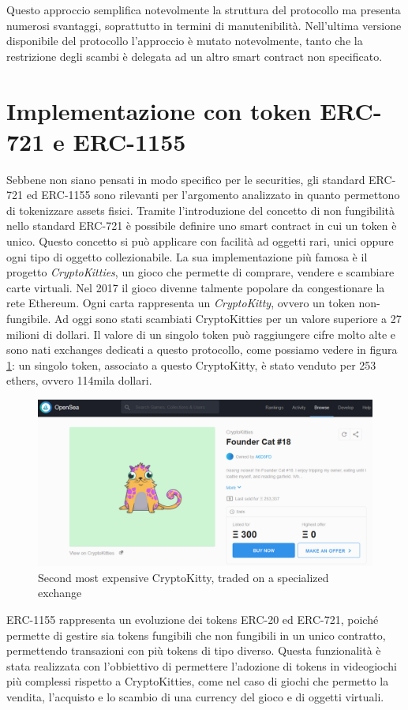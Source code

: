 Questo approccio semplifica notevolmente la struttura del protocollo ma presenta numerosi svantaggi, soprattutto in termini di manutenibilità. Nell'ultima versione disponibile del protocollo l'approccio è mutato notevolmente, tanto che la restrizione degli scambi è delegata ad un altro smart contract non specificato. 
\section{Implementazione con token ERC-721 e ERC-1155}
Sebbene non siano pensati in modo specifico per le securities, gli standard ERC-721 ed ERC-1155 sono rilevanti per l'argomento analizzato in quanto permettono di tokenizzare assets fisici. Tramite l'introduzione del concetto di non fungibilità nello standard ERC-721 è possibile definire uno smart contract in cui un token è unico. Questo concetto si può applicare con facilità ad oggetti rari, unici oppure ogni tipo di oggetto collezionabile. La sua implementazione più famosa è il progetto \textit{CryptoKitties}, un gioco che permette di comprare, vendere e scambiare carte virtuali. Nel 2017 il gioco divenne talmente popolare da congestionare la rete Ethereum. Ogni carta rappresenta un \textit{CryptoKitty}, ovvero un token  non-fungibile. Ad oggi sono stati scambiati CryptoKitties per un valore superiore a 27 milioni di dollari. Il valore di un singolo token può raggiungere cifre molto alte e sono nati exchanges dedicati a questo protocollo, come possiamo vedere in figura \ref{fig:kitty}: un singolo token, associato a questo CryptoKitty, è stato venduto per 253 ethers, ovvero 114mila dollari. 
\begin{figure}[H]
  \includegraphics[width=\linewidth]{kitty.png}
  \caption{Second most expensive CryptoKitty, traded on a specialized exchange}
  \label{fig:kitty}
\end{figure}

ERC-1155 rappresenta un evoluzione dei tokens ERC-20 ed ERC-721, poiché permette di gestire sia tokens fungibili che non fungibili in un unico contratto, permettendo transazioni con più tokens di tipo diverso. Questa funzionalità è stata realizzata con l'obbiettivo di permettere l'adozione di tokens in videogiochi più complessi rispetto a CryptoKitties, come nel caso di giochi che permetto la vendita, l'acquisto e lo scambio di una currency del gioco e di oggetti virtuali. 

